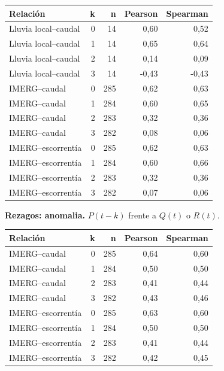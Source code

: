 \documentclass[10pt,a4paper]{article}
\begin{document}
\begin{center}\small\begin{tabular}{lrrrr}\hline
Relación & k & n & Pearson & Spearman \\ \hline
Lluvia local--caudal & 0 & 14 & 0,60 & 0,52 \\
Lluvia local--caudal & 1 & 14 & 0,65 & 0,64 \\
Lluvia local--caudal & 2 & 14 & 0,14 & 0,09 \\
Lluvia local--caudal & 3 & 14 & -0,43 & -0,43 \\
IMERG--caudal & 0 & 285 & 0,62 & 0,63 \\
IMERG--caudal & 1 & 284 & 0,60 & 0,65 \\
IMERG--caudal & 2 & 283 & 0,32 & 0,36 \\
IMERG--caudal & 3 & 282 & 0,08 & 0,06 \\
IMERG--escorrentía & 0 & 285 & 0,62 & 0,63 \\
IMERG--escorrentía & 1 & 284 & 0,60 & 0,66 \\
IMERG--escorrentía & 2 & 283 & 0,32 & 0,36 \\
IMERG--escorrentía & 3 & 282 & 0,07 & 0,06 \\
\hline\end{tabular}\end{center}
\textbf{Rezagos: anomalia.} $P(t-k)$ frente a $Q(t)$ o $R(t)$.
\begin{center}\small\begin{tabular}{lrrrr}\hline
Relación & k & n & Pearson & Spearman \\ \hline
IMERG--caudal & 0 & 285 & 0,64 & 0,60 \\
IMERG--caudal & 1 & 284 & 0,50 & 0,50 \\
IMERG--caudal & 2 & 283 & 0,41 & 0,44 \\
IMERG--caudal & 3 & 282 & 0,43 & 0,46 \\
IMERG--escorrentía & 0 & 285 & 0,63 & 0,60 \\
IMERG--escorrentía & 1 & 284 & 0,50 & 0,50 \\
IMERG--escorrentía & 2 & 283 & 0,41 & 0,44 \\
IMERG--escorrentía & 3 & 282 & 0,42 & 0,45 \\
\hline\end{tabular}\end{center}
\end{document}
